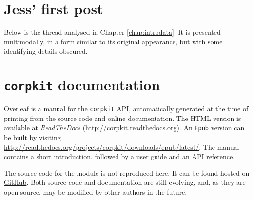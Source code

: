 \documentclass[a4paper,10pt,openright,abstract=on]{scrreprt}
\begin{document}
\begin{appendices}
\chapter{Jess' first post} \label{appendix:thread}

Below is the \gls{thread} analysed in Chapter \ref{chap:introdata}. It is presented multimodally, in a form similar to its original appearance, but with some identifying details obscured.



\clearpage

\chapter{\texttt{corpkit} documentation} \label{appendix:corpkit}

Overleaf is a manual for the \texttt{corpkit} \gls{API}, automatically generated at the time of printing from the source code and online documentation. The \gls{HTML} version is available at \emph{ReadTheDocs} (\url{http://corpkit.readthedocs.org}). An \texttt{Epub} version can be built by visiting \url{http://readthedocs.org/projects/corpkit/downloads/epub/latest/}. The manual contains a short introduction, followed by a user guide and an \gls{API} reference.

The source code for the module is not reproduced here. It can be found hosted on \href{https://github.com/interrogator/corpkit}{GitHub}. Both source code and documentation are still evolving, and, as they are open-source, may be modified by other authors in the future.


\end{appendices}
\end{document}
